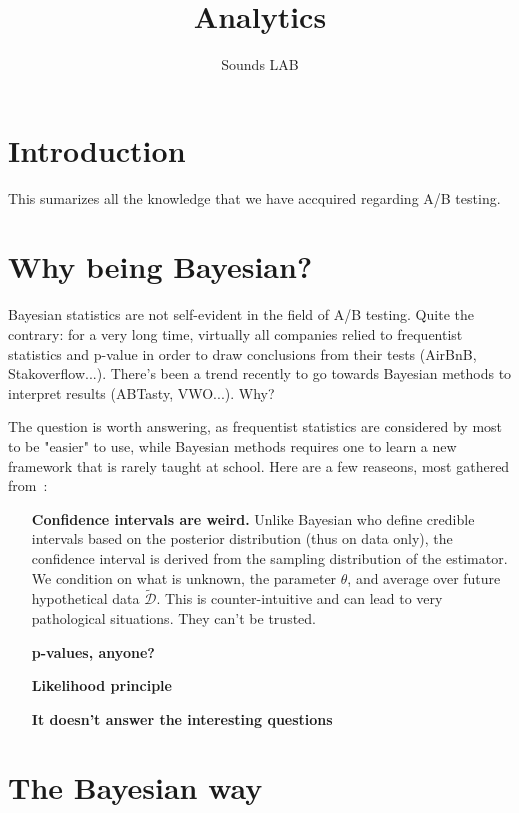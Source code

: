 \documentclass{tufte-book}
\title{Analytics}
\author[]{Sounds LAB}
\begin{document}
\maketitle

\tableofcontents

\cleardoublepage
\chapter*{Introduction}

This sumarizes all the knowledge that we have accquired regarding A/B testing.

\chapter{Why being Bayesian?}
\label{chap:why_bayes}

Bayesian statistics are not self-evident in the field of A/B testing. Quite the contrary: for a very long
time, virtually all companies relied to frequentist statistics and p-value in order to draw conclusions from
their tests (AirBnB, Stakoverflow...). There's been a trend recently to go towards Bayesian methods to
interpret results (ABTasty, VWO...). Why?

The question is worth answering, as frequentist statistics are considered by most to be "easier" to use, while
Bayesian methods requires one to learn a new framework that is rarely taught at school. Here are a few
reaseons, most gathered from~\cite{Murphy2012}:


\begin{itemize}
  \item[\textbf{Confidence intervals are weird.}] Unlike Bayesian who define credible intervals based on the
    posterior distribution (thus on data only), the confidence interval is derived from the sampling
    distribution of the estimator. We condition on what is unknown, the parameter $\theta$, and average over
    future hypothetical data $\tilde{\mathcal{D}}$. This is counter-intuitive and can lead to very
    pathological situations. They can't be trusted.
  \item[\textbf{p-values, anyone?}]
  \item[\textbf{Likelihood principle}]
  \item[\textbf{It doesn't answer the interesting questions}]
\end{itemize}

\chapter{The Bayesian way}
\label{chap:Bayes}
\end{document}
